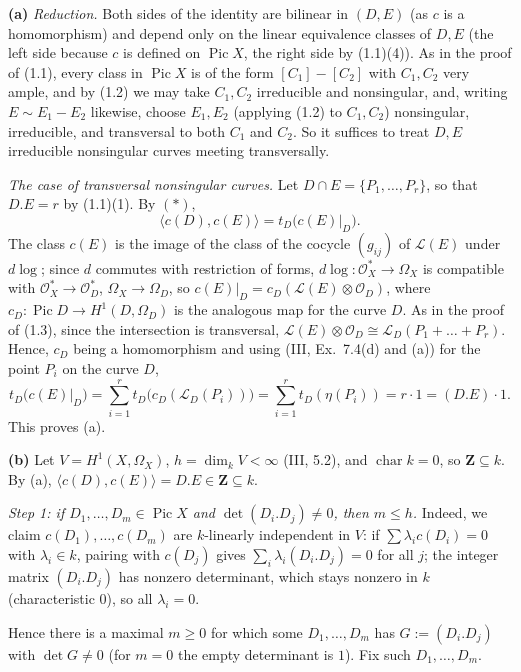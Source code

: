 \documentclass[11pt]{article}
\begin{document}
\textbf{(a)} \emph{Reduction.} Both sides of the identity are bilinear in $(D,E)$ (as $c$ is a homomorphism) and depend only on the linear equivalence classes of $D,E$ (the left side because $c$ is defined on $\operatorname{Pic}X$, the right side by (1.1)(4)). As in the proof of (1.1), every class in $\operatorname{Pic}X$ is of the form $[C_1]-[C_2]$ with $C_1,C_2$ very ample, and by (1.2) we may take $C_1,C_2$ irreducible and nonsingular, and, writing $E\sim E_1-E_2$ likewise, choose $E_1,E_2$ (applying (1.2) to $C_1,C_2$) nonsingular, irreducible, and transversal to both $C_1$ and $C_2$. So it suffices to treat $D,E$ irreducible nonsingular curves meeting transversally.

\emph{The case of transversal nonsingular curves.} Let $D\cap E=\{P_1,\dots,P_r\}$, so that $D.E=r$ by (1.1)(1). By $(*)$,
\[ \langle c(D),c(E)\rangle=t_D\bigl(c(E)|_D\bigr). \]
The class $c(E)$ is the image of the class of the cocycle $(g_{ij})$ of $\mathcal L(E)$ under $d\log$; since $d$ commutes with restriction of forms, $d\log:\mathcal O_X^*\to\Omega_X$ is compatible with $\mathcal O_X^*\to\mathcal O_D^*$, $\Omega_X\to\Omega_D$, so $c(E)|_D=c_D(\mathcal L(E)\otimes\mathcal O_D)$, where $c_D:\operatorname{Pic}D\to H^1(D,\Omega_D)$ is the analogous map for the curve $D$. As in the proof of (1.3), since the intersection is transversal, $\mathcal L(E)\otimes\mathcal O_D\cong\mathcal L_D(P_1+\dots+P_r)$. Hence, $c_D$ being a homomorphism and using (III, Ex.~7.4(d) and (a)) for the point $P_i$ on the curve $D$,
\[ t_D\bigl(c(E)|_D\bigr)=\sum_{i=1}^rt_D\bigl(c_D(\mathcal L_D(P_i))\bigr)=\sum_{i=1}^rt_D(\eta(P_i))=r\cdot1=(D.E)\cdot1. \]
This proves (a).

\textbf{(b)} Let $V=H^1(X,\Omega_X)$, $h=\dim_kV<\infty$ (III, 5.2), and $\operatorname{char}k=0$, so $\mathbf Z\subseteq k$. By (a), $\langle c(D),c(E)\rangle=D.E\in\mathbf Z\subseteq k$.

\emph{Step 1: if $D_1,\dots,D_m\in\operatorname{Pic}X$ and $\det(D_i.D_j)\neq0$, then $m\le h$.} Indeed, we claim $c(D_1),\dots,c(D_m)$ are $k$-linearly independent in $V$: if $\sum\lambda_ic(D_i)=0$ with $\lambda_i\in k$, pairing with $c(D_j)$ gives $\sum_i\lambda_i(D_i.D_j)=0$ for all $j$; the integer matrix $(D_i.D_j)$ has nonzero determinant, which stays nonzero in $k$ (characteristic $0$), so all $\lambda_i=0$.

Hence there is a maximal $m\ge0$ for which some $D_1,\dots,D_m$ has $G:=(D_i.D_j)$ with $\det G\ne0$ (for $m=0$ the empty determinant is $1$). Fix such $D_1,\dots,D_m$.
\end{document}
